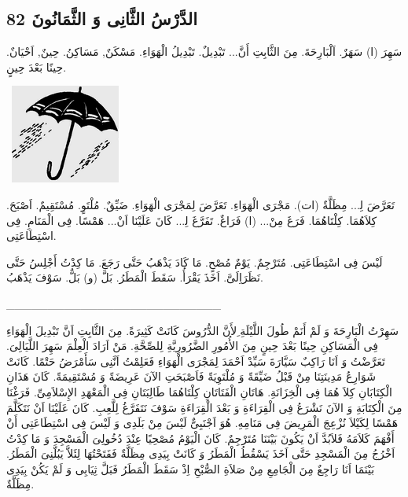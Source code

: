 \documentclass[a5paper]{article}
\begin{document}
\subsection{الدَّرْسُ الثَّانِى وَ الثَّمَانُونَ 82}
سَهِرَ (ا) سَهَرٌ. اَلْبَارِحَةَ. مِنَ الثَّابِتِ أَنَّ... تَبْدِيلٌ. تَبْدِيلُ الْهَوَاءِ. مَسْكَنٌ, مَسَاكِنُ. حِينٌ, اَحْيَانٌ. حِينًا بَعْدَ حِينٍ. 

\  \includegraphics[width=1.4165in,height=1.2811in]{MuhammadBagauddinlatinized-img235.png} 

تَعَرَّضَ لِ‍... مِظَلَّةٌ (ات). مَجْرَى الْهَوَاءِ. تَعَرَّضَ لِمَجْرَى الْهَوَاءِ. ضَيِّقٌ. مُلْتَوٍ. مُسْتَقِيمٌ. اَصْبَحَ. كِلاَهُمَا. كِلْتَاهُمَا. فَرَغَ مِنْ... (ا) فَرَاغٌ. تَفَرَّغَ لِ‍... كَانَ عَلَيْنَا اَنْ... هَمْسًا. فِى الْمَنَامِ. فِى اسْتِطَاعَتِى. 

لَيْسَ فِى اسْتِطَاعَتِى. مُتَرْجِمٌ. يَوْمٌ مُصْحٍ. مَا كَادَ يَذْهَبُ حَتَّى رَجَعَ. مَا كِدْتُ أَجْلِسُ حَتَّى نَظَرَاِلَىَّ. اَخَذَ يَقْرَأُ. سَقَطَ الْمَطَرُ. بَلَّ (و) بَلٌّ. سَوْفَ يَذْهَبُ.

\_\_\_\_\_\_\_\_\_\_\_\_\_\_\_\_\_\_\_\_\_\_\_\_\_\_

سَهِرْتُ الْبَارِحَةَ وَ لَمْ أَنَمْ طُولَ اللَّيْلَةِ ِلأَنَّ الدُّرُوسَ كَانَتْ كَثِيرَةً. مِنَ الثَّابِتِ اَنَّ تَبْدِيلَ الْهَوَاءِ فِى الْمَسَاكِنِ حِينًا بَعْدَ حِينٍ مِنَ الأُمُورِ الضَّرُورِيَّةِ لِلصِّحَّةِ. مَنْ اَرَادَ الْعِلْمَ سَهِرَ اللَّيَالِىَ. تَعَرَّضْتُ وَ اَنَا رَاكِبٌ سَيَّارَةَ سَيِّدْ اَحْمَدَ لِمَجْرَى الْهَوَاءِ فَعَلِمْتُ اَنَّنِى سَأَمْرَضُ حَتْمًا. كَانَتْ شَوَارِعُ مَدِينَتِنَا مِنْ قَبْلُ ضَيِّقَةً وَ مُلْتَوِيَةً فَاَصْبَحَتِ الآنَ عَرِيضَةً وَ مُسْتَقِيمَةً. كَانَ هَذَانِ الْكِتَابَانِ كِلاَ هُمَا فِى الْخِزَانَةِ. هَاتَانِ الْفَتَاتَانِ كِلْتَاهُمَا طَالِبَتَانِ فِى الْمَعْهَدِ الإِسْلاَمِىِّ. فَرَغْنَا مِنَ الْكِتَابَةِ وَ الآنَ نَشْرَعُ فِى الْقِرَاءَةِ وَ بَعْدَ الْقِرَاءَةِ سَوْفَ نَتَفَرَّغُ لِلَّعِبِ. كَانَ عَلَيْنَا اَنْ نَتَكَلَّمَ هَمْسًا لِكَيْلاَ نُزْعِجَ الْمَرِيضَ فِى مَنَامِهِ. هُوَ اَجْنَبِىٌّ لَيْسَ مِنْ بَلَدِى وَ لَيْسَ فِى اسْتِطَاعَتِى أَنْ أَفْهَمَ كَلاَمَهُ فَلاَبُدَّ اَنْ يَكُونَ بَيْنَنَا مُتَرْجِمٌ. كَانَ الْيَوْمُ مُصْحِيًا عِنْدَ دُخُولِىَ الْمَسْجِدَ وَ مَا كِدْتُ اَخْرُجُ مِنَ الْمَسْجِدِ حَتَّى اَخَذَ يَسْقُطُ الْمَطَرُ وَ كَانَتْ بِيَدِى مِظَلَّةٌ فَفَتَحْتُهَا لِئَلاَّ يَبُلَّنِىَ الْمَطَرُ. بَيْنَمَا اَنَا رَاجِعٌ مِنَ الْجَامِعِ مِنْ صَلاَةِ الصُّبْحِ اِذْ سَقَطَ الْمَطَرُ فَبَلَّ ثِيَابِى وَ لَمْ يَكُنْ بِيَدِى مِظَلَّةٌ.
\end{document}
